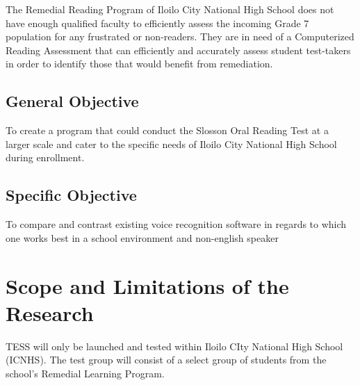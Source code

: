 The Remedial Reading Program of Iloilo City National High School does not have enough qualified faculty to efficiently assess the incoming Grade 7 population for any frustrated or non-readers. They are in need of a Computerized Reading Assessment that can efficiently and accurately assess student test-takers in order to identify those that would benefit from remediation.

\subsection{General Objective}
\label{sec:generalobjective}

To create a program that could conduct the Slosson Oral Reading Test at a larger scale and cater to the specific needs of Iloilo City National High School during enrollment.

\subsection{Specific Objective}
\label{sec:specificobjective}

To compare and contrast existing voice recognition software in regards to which one works best in a school environment and non-english speaker


\section{Scope and Limitations of the Research}
\label{sec:scopelimitations}

TESS will only be launched and tested within Iloilo CIty National High School (ICNHS). The test group will consist of a select group of students from the school’s Remedial Learning Program.



